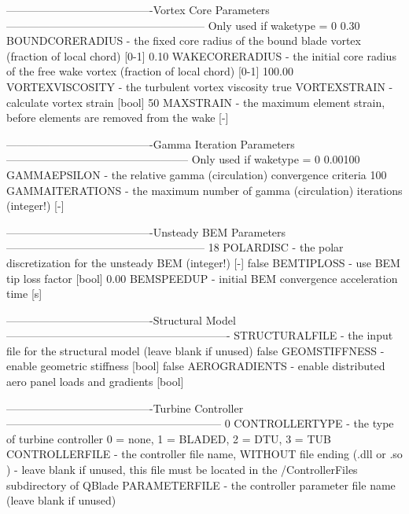 \begin{cfgcode}
----------------------------------------Vortex Core Parameters------------------------------------------------------
Only used if waketype = 0
0.30                                               BOUNDCORERADIUS    - the fixed core radius of the bound blade vortex (fraction of local chord) [0-1]
0.10                                               WAKECORERADIUS     - the initial core radius of the free wake vortex (fraction of local chord) [0-1]
100.00                                             VORTEXVISCOSITY    - the turbulent vortex viscosity
true                                               VORTEXSTRAIN       - calculate vortex strain [bool]
50                                                 MAXSTRAIN          - the maximum element strain, before elements are removed from the wake [-]

----------------------------------------Gamma Iteration Parameters--------------------------------------------------
Only used if waketype = 0
0.00100                                            GAMMAEPSILON       - the relative gamma (circulation) convergence criteria
100                                                GAMMAITERATIONS    - the maximum number of gamma (circulation) iterations (integer!) [-]

----------------------------------------Unsteady BEM Parameters------------------------------------------------------
18                                                 POLARDISC          - the polar discretization for the unsteady BEM (integer!) [-]
false                                              BEMTIPLOSS         - use BEM tip loss factor [bool]
0.00                                               BEMSPEEDUP         - initial BEM convergence acceleration time [s]

----------------------------------------Structural Model-------------------------------------------------------------
                                                   STRUCTURALFILE     - the input file for the structural model (leave blank if unused)
false                                              GEOMSTIFFNESS      - enable geometric stiffness [bool]
false                                              AEROGRADIENTS      - enable distributed aero panel loads and gradients [bool]

----------------------------------------Turbine Controller-----------------------------------------------------------
0                                                  CONTROLLERTYPE     - the type of turbine controller 0 = none, 1 = BLADED, 2 = DTU, 3 = TUB
                                                   CONTROLLERFILE     - the controller file name, WITHOUT file ending (.dll or .so ) - leave blank if unused, this file must be located in the /ControllerFiles subdirectory of QBlade
                                                   PARAMETERFILE      - the controller parameter file name (leave blank if unused)
\end{cfgcode}


